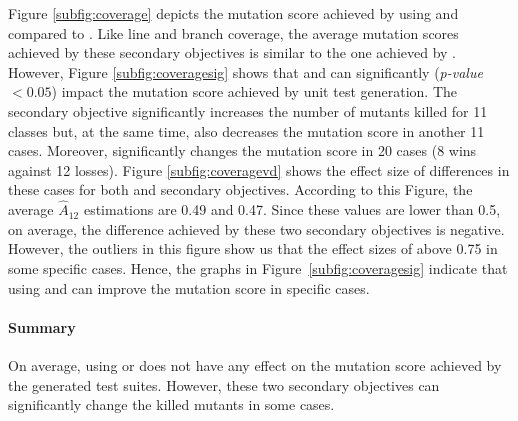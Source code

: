 Figure \ref{subfig:coverage} depicts the mutation score achieved by using \com and \ucom compared to \df. Like line and branch coverage, the average mutation scores achieved by these secondary objectives is similar to the one achieved by \df. 
However, Figure \ref{subfig:coveragesig} shows that \com and \ucom can significantly (\textit{p-value} $<0.05$) impact the mutation score achieved by unit test generation. The \com secondary objective significantly increases the number of mutants killed for 11 classes but, at the same time, also decreases the mutation score in another 11 cases. Moreover, \ucom significantly changes the mutation score in 20 cases (8 wins against 12 losses). 
Figure \ref{subfig:coveragevd} shows the effect size of differences in these cases for both \com and \ucom secondary objectives. According to this Figure, the average $\widehat{A}_{12}$ estimations are 0.49 and 0.47. Since these values are lower than 0.5, on average, the difference achieved by these two secondary objectives is negative. However, the outliers in this figure show us that the effect sizes of \com above 0.75 in some specific cases. Hence, the graphs in Figure~\ref{subfig:coveragesig} indicate that using \com and \ucom can improve the mutation score in specific cases.

\paragraph{Summary} On average, using \com or \ucom does not have any effect on the mutation score achieved by the generated test suites. However, these two secondary objectives can significantly change the killed mutants in some cases.